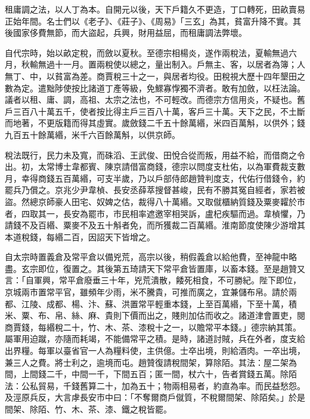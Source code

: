 
\begin{pinyinscope}

 租庸調之法，以人丁為本。自開元以後，天下戶籍久不更造，丁口轉死，田畝賣易正始年間。名士們以《老子》、《莊子》、《周易》「三玄」為其，貧富升降不實。其後國家侈費無節，而大盜起，兵興，財用益屈，而租庸調法弊壞。



 自代宗時，始以畝定稅，而斂以夏秋。至德宗相楊炎，遂作兩稅法，夏輸無過六月，秋輸無過十一月。置兩稅使以總之，量出制入。戶無主、客，以居者為簿；人無丁、中，以貧富為差。商賈稅三十之一，與居者均役。田稅視大歷十四年墾田之數為定。遣黜陟使按比諸道丁產等級，免鰥寡惸獨不濟者。敢有加斂，以枉法論。議者以租、庸、調，高祖、太宗之法也，不可輕改。而德宗方信用炎，不疑也。舊戶三百八十萬五千，使者按比得主戶三百八十萬，客戶三十萬。天下之民，不土斷而地著，不更版籍而得其虛實。歲斂錢二千五十餘萬緡，米四百萬斛，以供外；錢九百五十餘萬緡，米千六百餘萬斛，以供京師。



 稅法既行，民力未及寬，而硃滔、王武俊、田悅合從而叛，用益不給，而借商之令出。初，太常博士韋都賓、陳京請借富商錢，德宗以問度支杜佑，以為軍費裁支數月，幸得商錢五百萬緡，可支半歲，乃以戶部侍郎趙贊判度支，代佑行借錢令，約罷兵乃償之。京兆少尹韋楨、長安丞薛萃搜督甚峻，民有不勝其冤自經者，家若被盜。然總京師豪人田宅、奴婢之估，裁得八十萬緡。又取僦櫃納質錢及粟麥糶於市者，四取其一，長安為罷市，市民相率遮邀宰相哭訴，盧杞疾驅而過。韋楨懼，乃請錢不及百緡、粟麥不及五十斛者免，而所獲裁二百萬緡。淮南節度使陳少游增其本道稅錢，每緡二百，因詔天下皆增之。



 自太宗時置義倉及常平倉以備兇荒，高宗以後，稍假義倉以給他費，至神龍中略盡。玄宗即位，復置之。其後第五琦請天下常平倉皆置庫，以畜本錢。至是趙贊又言：「自軍興，常平倉廢垂三十年，兇荒潰散，餧死相食，不可勝紀。陛下即位，京城兩市置常平官，雖頻年少雨，米不騰貴，可推而廣之，宜兼儲布帛。請於兩都、江陵、成都、楊、汴、蘇、洪置常平輕重本錢，上至百萬緡，下至十萬，積米、粟、布、帛、絲、麻、貴則下價而出之，賤則加估而收之。諸道津會置吏，閱商賈錢，每緡稅二十，竹、木、茶、漆稅十之一，以贍常平本錢。」德宗納其策。屬軍用迫蹴，亦隨而耗竭，不能備常平之積。是時，諸道討賊，兵在外者，度支給出界糧。每軍以臺省官一人為糧料使，主供億。士卒出境，則給酒肉。一卒出境，兼三人之費。將士利之，逾境而屯。趙贊復請稅間架，算除陌。其法：屋二架為間，上間錢二千，中間一千，下間五百；匿一間，杖六十，告者賞錢五萬。除陌法：公私貿易，千錢舊算二十，加為五十；物兩相易者，約直為率。而民益愁怨。及涇原兵反，大言虖長安市中曰：「不奪爾商戶僦質，不稅爾間架、除陌矣。」於是間架、除陌、竹、木、茶、漆、鐵之稅皆罷。




\end{pinyinscope}
